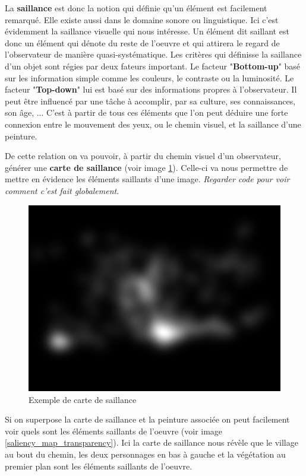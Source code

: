 \par
La \textbf{saillance} est donc la notion qui définie qu'un élément est facilement remarqué. Elle existe aussi dans le domaine sonore ou linguistique. Ici c'est évidemment la saillance visuelle qui nous intéresse. Un élément dit saillant est donc un élément qui dénote du reste de l'oeuvre et qui attirera le regard de l'observateur de manière quasi-systématique. Les critères qui définisse la saillance d'un objet sont régies par deux fateurs important. Le facteur "\textbf{Bottom-up}" basé sur les information simple comme les couleurs, le contraste ou la luminosité. Le facteur "\textbf{Top-down}" lui est basé sur des informations propres à l'observateur. Il peut être influencé par une tâche à accomplir, par sa culture, ses connaissances, son âge, ... C'est à partir de tous ces éléments que l'on peut déduire une forte connexion entre le mouvement des yeux, ou le chemin visuel, et la saillance d'une peinture.

\par
De cette relation on va pouvoir, à partir du chemin visuel d'un observateur, générer une \textbf{carte de saillance} (voir image \ref{ex_saliency_map}). Celle-ci va nous permettre de mettre en évidence les éléments saillants d'une image. \textit{Regarder code pour voir comment c'est fait globalement}. 

\begin{figure}[!ht]
    \centering
    \includegraphics[width=0.7\linewidth]{datas/exemple_saliency_map.png}
    \caption{Exemple de carte de saillance}
    \label{ex_saliency_map}
\end{figure}

\par
Si on superpose la carte de saillance et la peinture associée on peut facilement voir quels sont les éléments saillants de l'oeuvre (voir image \ref{saliency_map_transparency}). Ici la carte de saillance nous révèle que le village au bout du chemin, les deux personnages en bas à gauche et la végétation au premier plan sont les éléments saillants de l'oeuvre.

